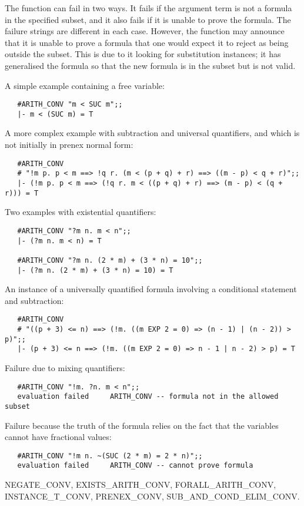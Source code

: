 \FAILURE
The function can fail in two ways. It fails if the argument term is not a
formula in the specified subset, and it also fails if it is unable to prove
the formula. The failure strings are different in each case. However, the
function may announce that it is unable to prove a formula that one would
expect it to reject as being outside the subset. This is due to it looking for
substitution instances; it has generalised the formula so that the new formula
is in the subset but is not valid.

\EXAMPLE
A simple example containing a free variable:
{\par\samepage\setseps\small
\begin{verbatim}
   #ARITH_CONV "m < SUC m";;
   |- m < (SUC m) = T
\end{verbatim}
}
\noindent A more complex example with subtraction and universal quantifiers,
and which is not initially in prenex normal form:
{\par\samepage\setseps\small
\begin{verbatim}
   #ARITH_CONV
   # "!m p. p < m ==> !q r. (m < (p + q) + r) ==> ((m - p) < q + r)";;
   |- (!m p. p < m ==> (!q r. m < ((p + q) + r) ==> (m - p) < (q + r))) = T
\end{verbatim}
}
\noindent Two examples with existential quantifiers:
{\par\samepage\setseps\small
\begin{verbatim}
   #ARITH_CONV "?m n. m < n";;
   |- (?m n. m < n) = T

   #ARITH_CONV "?m n. (2 * m) + (3 * n) = 10";;
   |- (?m n. (2 * m) + (3 * n) = 10) = T
\end{verbatim}
}
\noindent An instance of a universally quantified formula involving a conditional
statement and subtraction:
{\par\samepage\setseps\small
\begin{verbatim}
   #ARITH_CONV
   # "((p + 3) <= n) ==> (!m. ((m EXP 2 = 0) => (n - 1) | (n - 2)) > p)";;
   |- (p + 3) <= n ==> (!m. ((m EXP 2 = 0) => n - 1 | n - 2) > p) = T
\end{verbatim}
}
\noindent Failure due to mixing quantifiers:
{\par\samepage\setseps\small
\begin{verbatim}
   #ARITH_CONV "!m. ?n. m < n";;
   evaluation failed     ARITH_CONV -- formula not in the allowed subset
\end{verbatim}
}
\noindent Failure because the truth of the formula relies on the fact that the
variables cannot have fractional values:
{\par\samepage\setseps\small
\begin{verbatim}
   #ARITH_CONV "!m n. ~(SUC (2 * m) = 2 * n)";;
   evaluation failed     ARITH_CONV -- cannot prove formula
\end{verbatim}
}
\SEEALSO
NEGATE_CONV, EXISTS_ARITH_CONV, FORALL_ARITH_CONV, INSTANCE_T_CONV,
PRENEX_CONV, SUB_AND_COND_ELIM_CONV.

